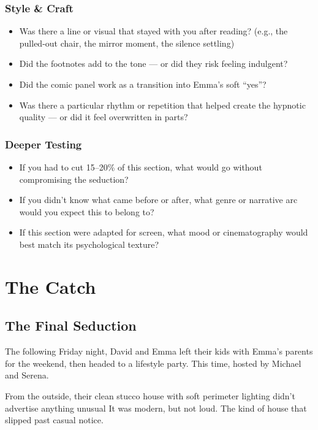 \subsubsection{Style \& Craft}

\begin{itemize}
\item Was there a line or visual that stayed with you after reading? (e.g., the pulled-out chair, the mirror moment, the silence settling)
\item Did the footnotes add to the tone — or did they risk feeling indulgent?
\item Did the comic panel work as a transition into Emma’s soft “yes”?
\item Was there a particular rhythm or repetition that helped create the hypnotic quality — or did it feel overwritten in parts?
\end{itemize}

\subsubsection{Deeper Testing}

\begin{itemize}
\item If you had to cut 15–20\% of this section, what would go without compromising the seduction?
\item If you didn’t know what came before or after, what genre or narrative arc would you expect this to belong to?
\item If this section were adapted for screen, what mood or cinematography would best match its psychological texture?
\end{itemize}







\section{The Catch}

\subsection{The Final Seduction}

The following Friday night, David and Emma left their kids with Emma's parents for the weekend,
then headed to a lifestyle party. This time, hosted by Michael and Serena.

From the outside, their clean stucco house with soft perimeter lighting didn’t advertise anything unusual
It was modern, but not loud. The kind of house that slipped past casual notice.

